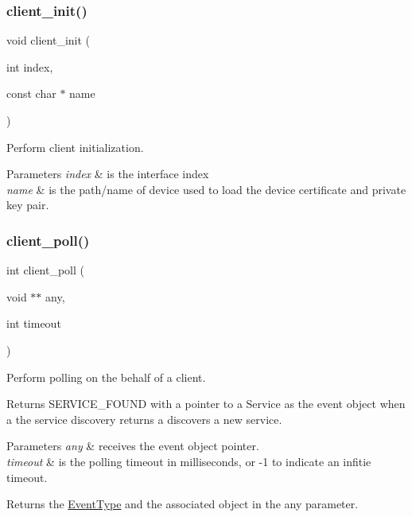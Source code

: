 \subsubsection{\texorpdfstring{client\+\_\+init()}{client\_init()}}
{\footnotesize\ttfamily void client\+\_\+init (\begin{DoxyParamCaption}\item[{int}]{index,  }\item[{const char $\ast$}]{name }\end{DoxyParamCaption})}



Perform client initialization. 


\begin{DoxyParams}{Parameters}
{\em index} & is the interface index \\
\hline
{\em name} & is the path/name of device used to load the device certificate and private key pair. \\
\hline
\end{DoxyParams}
\mbox{\label{group__client_ga7c5c3327618a1b3c4757c415fb42ba8d}} 
\subsubsection{\texorpdfstring{client\+\_\+poll()}{client\_poll()}}
{\footnotesize\ttfamily int client\+\_\+poll (\begin{DoxyParamCaption}\item[{void $\ast$$\ast$}]{any,  }\item[{int}]{timeout }\end{DoxyParamCaption})}



Perform polling on the behalf of a client. 

Returns S\+E\+R\+V\+I\+C\+E\+\_\+\+F\+O\+U\+ND with a pointer to a Service as the event object when a the service discovery returns a discovers a new service. 
\begin{DoxyParams}{Parameters}
{\em any} & receives the event object pointer. \\
\hline
{\em timeout} & is the polling timeout in milliseconds, or -\/1 to indicate an infitie timeout. \\
\hline
\end{DoxyParams}
\begin{DoxyReturn}{Returns}
the \hyperlink{group__event_ga2628ea8d12e8b2563c32f05dc7fff6fa}{Event\+Type} and the associated object in the any parameter. 
\end{DoxyReturn}
